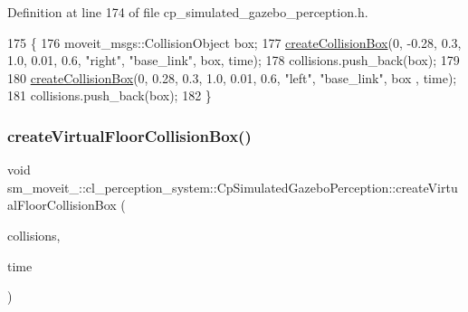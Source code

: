 Definition at line 174 of file cp\+\_\+simulated\+\_\+gazebo\+\_\+perception.\+h.


\begin{DoxyCode}
175             \{
176                 moveit\_msgs::CollisionObject box;
177                 \hyperlink{classsm__moveit__4_1_1cl__perception__system_1_1CpSimulatedGazeboPerception_aae9d3b564d1442453dac71a2d9fe89fe}{createCollisionBox}(0, -0.28, 0.3, 1.0, 0.01, 0.6, \textcolor{stringliteral}{"right"}, \textcolor{stringliteral}{"base\_link"}, 
      box, time);
178                 collisions.push\_back(box);
179 
180                 \hyperlink{classsm__moveit__4_1_1cl__perception__system_1_1CpSimulatedGazeboPerception_aae9d3b564d1442453dac71a2d9fe89fe}{createCollisionBox}(0, 0.28, 0.3, 1.0, 0.01, 0.6, \textcolor{stringliteral}{"left"}, \textcolor{stringliteral}{"base\_link"}, box
      , time);
181                 collisions.push\_back(box);
182             \}
\end{DoxyCode}
\mbox{\label{classsm__moveit__4_1_1cl__perception__system_1_1CpSimulatedGazeboPerception_a668b93281f2ab325c790e20f452f3f8f}} 
\subsubsection{\texorpdfstring{create\+Virtual\+Floor\+Collision\+Box()}{createVirtualFloorCollisionBox()}}
{\footnotesize\ttfamily void sm\+\_\+moveit\+\_\+::cl\+\_\+perception\+\_\+system\+::\+Cp\+Simulated\+Gazebo\+Perception\+::create\+Virtual\+Floor\+Collision\+Box (\begin{DoxyParamCaption}\item[{std\+::vector$<$ moveit\+\_\+msgs\+::\+Collision\+Object $>$ \&}]{collisions,  }\item[{ros\+::\+Time}]{time }\end{DoxyParamCaption})\hspace{0.3cm}{\ttfamily [inline]}}



